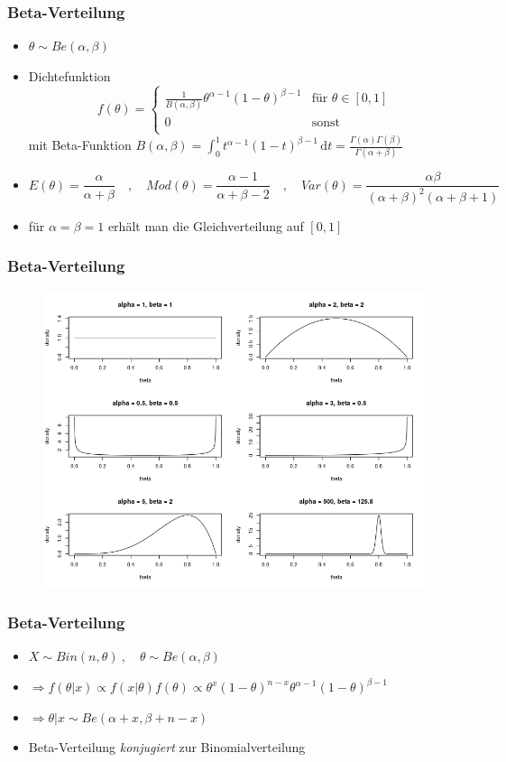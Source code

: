 \documentclass[aspectratio=169,xcolor=dvipsnames]{beamer}
\begin{document}
\begin{frame}
\frametitle{Beta-Verteilung}
\begin{itemize}
	\item<1-> $\theta \sim Be(\alpha,\beta)$
	\item<2-> Dichtefunktion $$f(\theta)=\left\{\begin{array}{ll}
	\frac{1}{B(\alpha,\beta)}\theta^{\alpha -1}(1-\theta)^{\beta -1} & \text{für }\theta\in[0,1]\\
	0 & \text{sonst}\\
	\end{array}\right.$$
	mit Beta-Funktion $B(\alpha,\beta)=\int_0^1t^{\alpha-1}(1-t)^{\beta-1}\,\text{d}t = \frac{\Gamma(\alpha)\Gamma(\beta)}{\Gamma(\alpha+\beta)}$
	\item<3-> $$E(\theta) = \frac{\alpha}{\alpha+\beta}\quad,\quad Mod(\theta)=\frac{\alpha-1}{\alpha+\beta-2}\quad,\quad Var(\theta)=\frac{\alpha\beta}{(\alpha+\beta)^2(\alpha+\beta+1)}$$
	\item<4-> für $\alpha=\beta=1$ erhält man die Gleichverteilung auf $[0,1]$
\end{itemize}
\end{frame}

\begin{frame}
\frametitle{Beta-Verteilung}
\begin{figure}
	\includegraphics[height=0.85\textheight]{betaDistribution}
\end{figure}
\end{frame}

\begin{frame}
\frametitle{Beta-Verteilung}
\begin{itemize}
	\item<1-> $X\sim Bin(n,\theta)~,\quad \theta\sim Be(\alpha,\beta)$
	\item<2-> $\Rightarrow f(\theta|x)\propto f(x|\theta)f(\theta)\propto \theta^x(1-\theta)^{n-x}\theta^{\alpha-1}(1-\theta)^{\beta-1}$
	\item<3-> $\Rightarrow \theta|x \sim Be(\alpha+x,\beta+n-x)$
	\item<4-> Beta-Verteilung \textit{konjugiert} zur Binomialverteilung
\end{itemize}
\end{frame}
\end{document}
